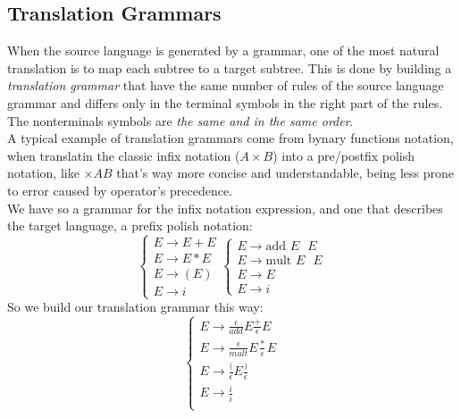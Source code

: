 \documentclass[10pt,a4paper]{article}
\begin{document}
			\subsection{Translation Grammars}
				When the source language is generated by a grammar, one of the most natural translation is to map each subtree to a target subtree. This is done by building a \emph{translation grammar} that have the same number of rules of the source language grammar and differs only in the terminal symbols in the right part of the rules. The nonterminals symbols are \emph{the same and in the same order}.\\
				A typical example of translation grammars come from bynary functions notation, when translatin the classic infix notation ($A \times B$) into a pre/postfix polish notation, like $\times A B$ that's way more concise and understandable, being less prone to error caused by operator's precedence.\\
				We have so a grammar for the infix notation expression, and one that describes the target language, a prefix polish notation:
				\begin{equation}
					\begin{cases}
						E \rightarrow E + E \\
						E \rightarrow E * E \\
						E \rightarrow ( E ) \\
						E \rightarrow i
					\end{cases} 
					\begin{cases}
						E \rightarrow \text{add } E \text{ } E \\
						E \rightarrow \text{mult } E \text{ } E \\
						E \rightarrow E  \\
						E \rightarrow i
					\end{cases}
				\end{equation}
				So we build our translation grammar this way:
				\begin{equation}
					\begin{cases}
						E \rightarrow \frac{\epsilon}{add} E \frac{+}{\epsilon} E \\
						E \rightarrow \frac{\epsilon}{mult} E \frac{*}{\epsilon} E \\
						E \rightarrow \frac{(}{\epsilon} E \frac{)}{\epsilon} \\
						E \rightarrow \frac{i}{i} \\
					\end{cases}
				\end{equation}
				
\end{document}

